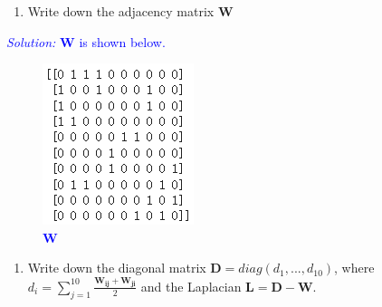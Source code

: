 \documentclass{article}
\def\solColor{blue}
\begin{document}
\begin{enumerate}
    \item Write down the adjacency matrix $\boldsymbol{W}$
\end{enumerate}
\textcolor{\solColor}{\textit{Solution:}
$\boldsymbol{W}$ is shown below.
	\begin{figure}[H]
	\centerline{\includegraphics[width = 5 cm, height = 10 cm]{sol 2-1.png}}
	\label{fig:sol 2-1}
  \caption{
	$\boldsymbol{W}$
	}
	\end{figure}
}
\begin{enumerate}[resume]
    \item Write down the diagonal matrix $\boldsymbol{D}=diag(d_1,...,d_{10})$, where $d_i=\sum_{j=1}^{10} \frac{\boldsymbol{W_{ij}}+\boldsymbol{W_{ji}}}{2}$ and the Laplacian $\boldsymbol{L}=\boldsymbol{D}-\boldsymbol{W}$.
\end{enumerate}
\end{document}
